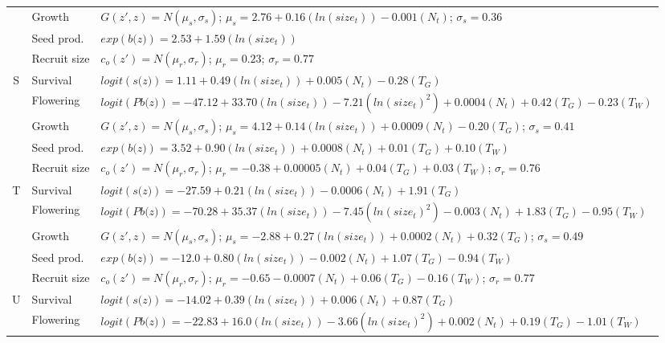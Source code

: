 \documentclass[12pt, letterpaper]{article}
\begin{document}
\begin{spacing}{1.3}
\begin{longtable}[ht!]{c|l|p{}}
         & Growth  &  $G(z',z) = N(\mu_s, \sigma_s)$; $\mu_s = 2.76 + 0.16(ln(size_t)) - 0.001(N_t)$; $\sigma_s = 0.36$\\
         \rowcolor[gray]{.95}& Seed prod.  & $exp(\textit{b(z)}) = 2.53 + 1.59(ln(size_t))$  \\
         & Recruit size  &  $c_o(z') = N(\mu_r, \sigma_r)$; $\mu_r = 0.23$; $\sigma_r = 0.77$ \\
         \hline
         \rowcolor[gray]{.95}S  &  Survival  &  $logit(\textit{s(z)})= 1.11 + 0.49(ln(size_t)) + 0.005(N_t) - 0.28 (T_G)$ \\
         & Flowering  & $logit(\textit{Pb(z)}) = -47.12 + 33.70(ln(size_t)) -7.21(ln(size_t)^2) +0.0004 (N_t) + 0.42 (T_G) - 0.23 (T_W)$ \\
         \rowcolor[gray]{.95}& Growth  &  $G(z',z) = N(\mu_s, \sigma_s)$; $\mu_s = 4.12 + 0.14(ln(size_t)) +0.0009(N_t) -0.20 (T_G)$; $\sigma_s = 0.41$\\
         & Seed prod.  & $exp(\textit{b(z)}) = 3.52 + 0.90(ln(size_t)) + 0.0008 (N_t) + 0.01 (T_G) + 0.10 (T_W)$  \\
         \rowcolor[gray]{.95}& Recruit size  &  $c_o(z') = N(\mu_r, \sigma_r)$; $\mu_r = -0.38 + 0.00005 (N_t) + 0.04 (T_G) + 0.03 (T_W) $; $\sigma_r = 0.76$ \\
         \hline
         T  &  Survival  &  $logit(\textit{s(z)})= -27.59 + 0.21(ln(size_t)) -0.0006(N_t) + 1.91 (T_G)$ \\
         \rowcolor[gray]{.95}& Flowering  & $logit(\textit{Pb(z)})  = -70.28 + 35.37(ln(size_t)) -7.45(ln(size_t)^2) - 0.003 (N_t) + 1.83 (T_G) - 0.95 (T_W)$ \\
         & Growth  &  $G(z',z) = N(\mu_s, \sigma_s)$; $\mu_s = -2.88 + 0.27(ln(size_t)) +0.0002 (N_t) + 0.32 (T_G)$; $\sigma_s = 0.49$\\
         \rowcolor[gray]{.95}& Seed prod.  & $exp(\textit{b(z)}) = -12.0 + 0.80(ln(size_t)) -0.002 (N_t) + 1.07 (T_G) - 0.94 (T_W)$  \\
         & Recruit size  &  $c_o(z') = N(\mu_r, \sigma_r)$; $\mu_r = -0.65 -0.0007 (N_t) + 0.06 (T_G) - 0.16 (T_W) $; $\sigma_r = 0.77$ \\
         \hline
         \rowcolor[gray]{.95}U  &  Survival  &  $logit(\textit{s(z)})= -14.02 + 0.39(ln(size_t)) + 0.006(N_t) + 0.87 (T_G)$ \\
         & Flowering  & $logit(\textit{Pb(z)})  = -22.83 + 16.0(ln(size_t)) -3.66(ln(size_t)^2) + 0.002 (N_t) + 0.19 (T_G) - 1.01 (T_W)$ \\

\end{longtable}
\end{spacing}
\end{document}
